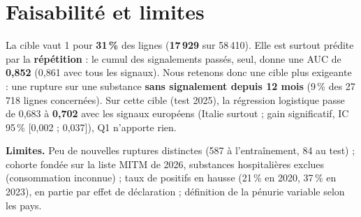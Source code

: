 \section{Faisabilité et limites}

La cible vaut 1 pour \textbf{31\,\%} des lignes (\textbf{17\,929} sur 58\,410). Elle est surtout prédite par la
\textbf{répétition} : le cumul des signalements passés, seul, donne une AUC de \textbf{0,852} (0,861 avec tous les signaux). Nous retenons donc
une cible plus exigeante : une rupture sur une substance \textbf{sans signalement depuis 12 mois} (9\,\% des 27\,718 lignes
concernées). Sur cette cible (test 2025), la régression logistique passe de 0,683 à \textbf{0,702} avec les signaux européens
(Italie surtout ; gain significatif, IC 95\,\% [0,002 ; 0,037]), Q1 n'apporte rien.

\textbf{Limites.} Peu de nouvelles ruptures distinctes (587 à l'entraînement, 84 au test) ; cohorte fondée sur la liste MITM
de 2026, substances hospitalières exclues (consommation inconnue) ; taux de positifs en hausse (21\,\% en 2020, 37\,\% en 2023),
en partie par effet de déclaration ; définition de la pénurie variable selon les pays.
